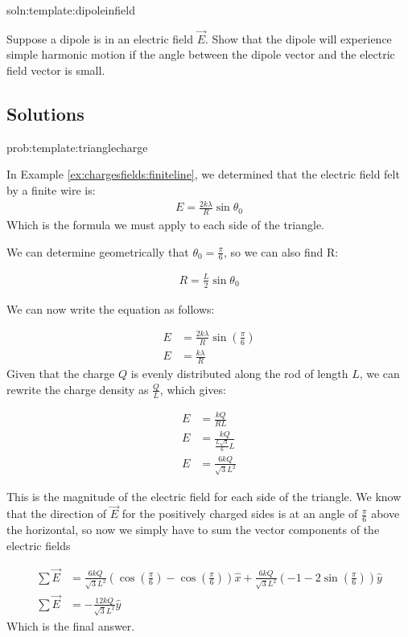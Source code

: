 \begin{problem}{soln:template:dipoleinfield}{\label{prob:template:dipoleinfield}}
	
	
	Suppose a dipole is in an electric field $\vec E$. Show that the dipole will experience simple harmonic motion if the angle between the dipole vector and the electric field vector is small.
	
\end{problem}

\newpage
\subsection{Solutions}
\begin{solution}{prob:template:trianglecharge}\label{soln:template:trianglecharge}

In Example \ref{ex:chargesfields:finiteline}, we determined that the electric field felt by a finite wire is:
\begin{align*}
E = \frac{2k\lambda}{R}\sin\theta_0
\end{align*}
Which is the formula we must apply to each side of the triangle. 

We can determine geometrically that $\theta_0 = \frac{\pi}{6}$, so we can also find R:

\begin{align*}
	R = \frac{L}{2}\sin{\theta_0}
\end{align*}


We can now write the equation as follows:

\begin{align*}
E& = \frac{2k\lambda}{R}\sin(\frac{\pi}{6})\\
E &= \frac{k\lambda}{R}
\end{align*}
Given that the charge $Q$ is evenly distributed along the rod of length $L$, we can rewrite the charge density as $\frac{Q}{L}$, which gives:

\begin{align*}
E& = \frac{k Q}{RL}\\
E& = \frac{k Q}{\frac{L\sqrt{3}}{6}L}\\
E& = \frac{6k Q}{\sqrt{3}L^2}
\end{align*}

This is the magnitude of the electric field for each side of the triangle. We know that the direction of $\vec E$ for the positively charged sides is at an angle of $\frac{\pi}{6}$ above the horizontal, so now we simply have to sum the vector components of the electric fields

\begin{align*}
\sum \vec E &= \frac{6k Q}{\sqrt{3}L^2}(\cos({\frac{\pi}{6}}) - \cos({\frac{\pi}{6}}))\hat{x} + \frac{6k Q}{\sqrt{3}L^2}(-1-2\sin({\frac{\pi}{6}}))\hat y\\
\sum \vec E & = -\frac{12k Q}{\sqrt{3}L^2}\hat y
\end{align*}
Which is the final answer.
\end{solution}


